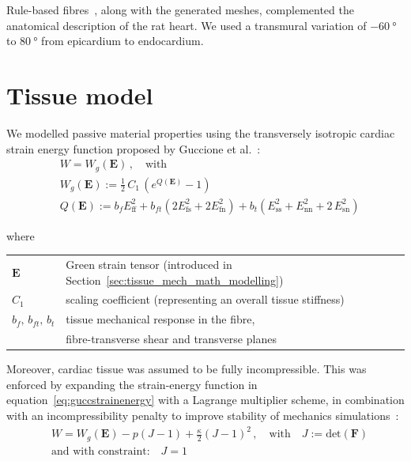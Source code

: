 \vspace{0.2cm}
Rule-based fibres~\cite{Bayer:2012}, along with the generated meshes, complemented the anatomical description of the rat heart. We used a transmural variation of $\SI{-60}{\degree}$ to $\SI{80}{\degree}$ from epicardium to endocardium.


%
%
%
\section{Tissue model}\label{sec:ch2tissuemodel}
We modelled passive material properties using the transversely isotropic cardiac strain energy function proposed by Guccione et al.~\cite{Guccione:1991}:
%
\begin{align}\label{eq:guccstrainenergy}
    &W = W_g(\mathbf{E})\,,\quad\text{with} \\
    &W_g(\mathbf{E}) := \frac{1}{2}\,C_1\,(e^{Q(\mathbf{E})}-1) \\
    &Q(\mathbf{E}) := b_f E_{\text{ff}}^2 + b_{ft}(2E_{\text{fs}}^2+2E_{\text{fn}}^2) + b_t(E_{\text{ss}}^2+E_{\text{nn}}^2+2\,E_{\text{sn}}^2)
\end{align}

\noindent
where

\vspace{0.2cm}
\begin{tabular}{ll}
    $\mathbf{E}$ & Green strain tensor (introduced in Section~\ref{sec:tissue_mech_math_modelling}) \\
    $C_1$ & scaling coefficient (representing an overall tissue stiffness) \\
    $b_f,\,b_{ft},\,b_t$ & tissue mechanical response in the fibre, \\ & fibre-transverse shear and transverse planes \\
\end{tabular}

\vspace{0.2cm}\noindent
Moreover, cardiac tissue was assumed to be fully incompressible. This was enforced by expanding the strain-energy function in equation~\eqref{eq:guccstrainenergy} with a Lagrange multiplier scheme, in combination with an incompressibility penalty to improve stability of mechanics simulations~\cite{Land:2012*a, Land:2015*b}:
%
\begin{align}\label{eq:landstrainenergy}
    &W = W_g(\mathbf{E}) - p(J - 1) + \frac{\kappa}{2}(J - 1)^2\,,\quad\text{with}\quad J:=\text{det}(\mathbf{F}) \\
    &\text{and with constraint:}\quad J=1
\end{align}

